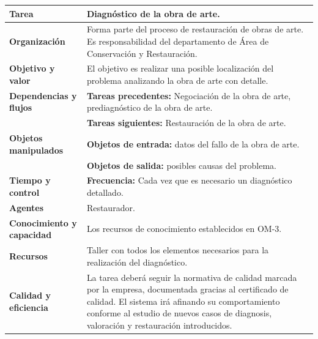 \documentclass[a4paper,11pt]{article}
\begin{document}
			\begin{center}
				\begin{tabular}{| l | p{6.5cm} |}
					\hline
					\textbf{Tarea} & Diagnóstico de la obra de arte.\\
					\hline
					\textbf{Organización} & Forma parte del proceso de restauración de obras de
					arte. Es responsabilidad del departamento de Área de Conservación y
					Restauración.\\
					\hline
					\textbf{Objetivo y valor} & El objetivo es realizar una posible
					localización del problema analizando la obra de arte con detalle.\\
					\hline
					\textbf{Dependencias y flujos} & \textbf{Tareas precedentes:} Negociación
					de la obra de arte, prediagnóstico de la obra de arte.\\
					& \textbf{Tareas siguientes:} Restauración de la obra de arte.\\
					\hline
					\textbf{Objetos manipulados} & \textbf{Objetos de entrada:} datos del fallo
					de la obra de arte.\\
					& \textbf{Objetos de salida:} posibles causas del
					problema.\\
					\hline
					\textbf{Tiempo y control} & \textbf{Frecuencia:} Cada vez que es necesario
					un diagnóstico detallado.\\
					\hline
					\textbf{Agentes} & Restaurador.\\
					\hline
					\textbf{Conocimiento y capacidad} & Los recursos de conocimiento
					establecidos en OM-3.\\
					\hline
					\textbf{Recursos} & Taller con todos los elementos necesarios para la
					realización del diagnóstico.\\
					\hline
					\textbf{Calidad y eficiencia} & La tarea deberá seguir la normativa de
					calidad marcada por la empresa, documentada gracias al certificado de calidad. El sistema irá afinando su comportamiento conforme al estudio de nuevos casos de diagnosis, valoración y restauración introducidos.\\
					\hline
				\end{tabular}
			\end{center}
			\newpage
\end{document}
